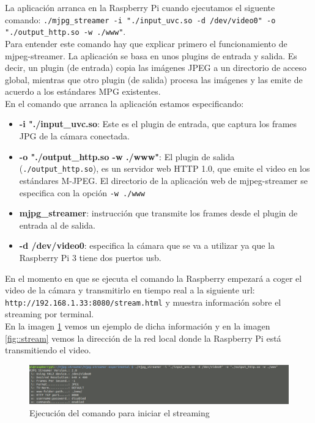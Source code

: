 \documentclass[twoside, 11pt]{epstfg}
\begin{document}
La aplicación arranca en la Raspberry Pi cuando ejecutamos el siguente comando: \texttt{./mjpg\_streamer -i "./input\_uvc.so -d /dev/video0" -o "./output\_http.so -w ./www"}.\\Para entender este comando hay que explicar primero el funcionamiento de mjpeg-streamer. La aplicación se basa en unos plugins de entrada y salida. Es decir, un plugin (de entrada) copia las imágenes JPEG a un directorio de acceso global, mientras que otro plugin (de salida) procesa las imágenes y las emite de acuerdo a los estándares MPG existentes.\\ En el comando que arranca la aplicación estamos especificando:
\begin{itemize}
	\item \textbf{ -i "./input\_uvc.so}: Este es el plugin de entrada, que captura los frames JPG de la cámara conectada.
	\item \textbf{-o "./output\_http.so -w ./www"}: El plugin de salida (\texttt{./output\_http.so}), es un servidor web HTTP 1.0, que emite el video en los estándares M-JPEG. El directorio de la aplicación web de mjpeg-streamer se especifica con la opción \texttt{-w ./www}
	\item \textbf{mjpg\_streamer}: instrucción que transmite los frames desde el plugin de entrada al de salida.
	\item \textbf{-d /dev/video0}: especifica la cámara que se va a utilizar ya que la Raspberry Pi 3 tiene dos puertos usb.
\end{itemize}

En el momento en que se ejecuta el comando la Raspberry empezará a coger el video de la cámara y transmitirlo en tiempo real a la siguiente url: \texttt{http://192.168.1.33:8080/stream.html} y muestra información sobre el streaming por terminal.\\
En la imagen \ref{fig::outmjpeg} vemos un ejemplo de dicha información y en la imagen \ref{fig::stream} vemos la dirección de la red local donde la Raspberry Pi está transmitiendo el video.

\begin{figure}[H]
	\centerline{
		\mbox{\includegraphics[width=.80\textwidth]{images/Streamingcomando.png}}
	}
	\caption{Ejecución del comando para iniciar el streaming}
	\label{fig::outmjpeg}
\end{figure}
\end{document}
